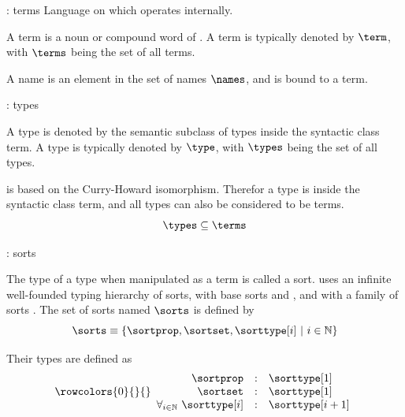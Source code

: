 \documentclass[department=ds, notes={hide notes}, slidesperpage=1]{beamerruhuisstijl}
\begin{document}
\begin{frame}{\pcic: terms}
	Language on which \coq operates internally.\\
	\bigskip
	\begin{definition}[term]
		A term is a noun or compound word of \pcic.
		A term is typically denoted by $\term$,
		with $\terms$ being the set of all terms.
	\end{definition}
	\bigskip
	\begin{definition}[name]
		A name is an element in the set of names $\names$, and is bound to a term.
	\end{definition}
\end{frame}

\begin{frame}{\pcic: types}

	\begin{definition}[type]
		A type is denoted by the semantic subclass of types inside the syntactic class term.
		A type is typically denoted by $\type$, with $\types$ being the set of all types.
	\end{definition}
	\bigskip
	\begin{lemma}
	\coq is based on the Curry-Howard isomorphism.
	Therefor a type is inside the syntactic class term, and all types can also be considered to be terms.
	\[ \types \subseteq \terms \]
	\end{lemma}
\end{frame}

\begin{frame}{\pcic: sorts}
	\begin{definition}[sort]
		The type of a type when manipulated as a term is called a sort.
		\pcic uses an infinite well-founded typing hierarchy of sorts,
		with base sorts \sortprop and \sortset,
		and with a family of sorts \sorttype[{i}].
		The set of sorts named $\sorts$ is defined by
		\[\sorts \equiv \{ \sortprop, \sortset, \sorttype[{i}] ~|~ i \in \mathbb{N} \} \]
	
		Their types are defined as
		\[
			\rowcolors{0}{}{}
			\begin{array}{rcl}
				\sortprop & : & \sorttype[1] \\
				\sortset & : & \sorttype[1] \\
				\forall_{i \in \mathbb{N}}~ \sorttype[i] & : & \sorttype[{i+1}]
			\end{array}
		\]
	\end{definition}
\end{frame}
\end{document}

